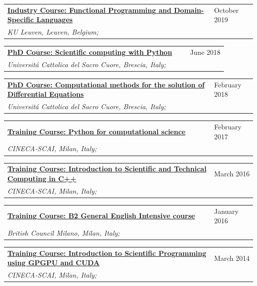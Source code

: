 \documentclass[a4paper]{article}
\newcommand{\longvoice}[8]{
    \begin{tabular}{p{0.83\linewidth} p{0.17\linewidth} }
        \textbf{\href{#3}{#2: #1}} & #4 
        \\ 
        \textit{#5, #6, #7;} & {\small\emph{#8}}
    \end{tabular}
    \vspace{.5em}
    }
\begin{document}
    \longvoice{Functional Programming and Domain-Specific Languages}
        {Industry Course}
        {https://dtai.cs.kuleuven.be/events/fpcourse/}
        {October 2019}
        {KU Leuven}
        {Leuven}
        {Belgium}
        {}
    \longvoice{Scientific computing with Python}
        {PhD Course}
        {https://web.archive.org/web/20180604081514/http://dmf.unicatt.it/~della/pythoncourse18/}
        {June 2018}
        {Universit\'a Cattolica del Sacro Cuore}
        {Brescia}
        {Italy}
        {}
    \longvoice{Computational methods for the solution of Differential Equations}
        {PhD Course}
        {https://www.dropbox.com/s/q2rapau2k49n5t7/1802-Course-NumericalPdeAvella.pdf?dl=0}
        {February 2018}
        {Universit\'a Cattolica del Sacro Cuore}
        {Brescia}
        {Italy}
        {}
    \longvoice{Python for computational science}
        {Training Course}
        {https://web.archive.org/web/20170623170252/https://eventi.cineca.it/en/hpc/python-computational-science}
        {February 2017}
        {CINECA-SCAI}
        {Milan}
        {Italy}
        {}
    \longvoice{Introduction to Scientific and Technical Computing in C++}
        {Training Course}
        {https://web.archive.org/save/http://www.hpc.cineca.it/content/introduction-object-oriented}
        {March 2016}
        {CINECA-SCAI}
        {Milan}
        {Italy}
        {}
    \longvoice{B2 General English Intensive course}
        {Training Course}
        {https://www.britishcouncil.it/en/english/courses-adults/general}
        {January 2016}
        {British Council Milano}
        {Milan}
        {Italy}
        {}
    \longvoice{Introduction to Scientific Programming using GPGPU and CUDA}
        {Training Course}
        {https://web.archive.org/web/20170623171128/http://www.hpc.cineca.it/content/introduction-to-gpu}
        {March 2014}
        {CINECA-SCAI}
        {Milan}
        {Italy}
        {}
    
\end{document}
